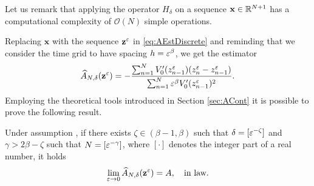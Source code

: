 \documentclass[10pt]{article}
\begin{document}
\begin{remark} Let us remark that applying the operator $H_\delta$ on a sequence $\mathbf x \in \mathbb{R}^{N+1}$ has a computational complexity of $\mathcal O(N)$ simple operations. 
\end{remark}

Replacing $\mathbf x$ with the sequence $\mathbf z^\varepsilon$ in \eqref{eq:AEstDiscrete} and reminding that we consider the time grid to have spacing $h = \varepsilon^\beta$, we get the estimator 
\begin{equation}\label{eq:AEstDiscreteZ}
	\widehat A_{N, \delta}(\mathbf z^\varepsilon) = -\frac{\sum_{n=1}^{N}V_0'(z^\varepsilon_{n-1})(z^\varepsilon_n - z^\varepsilon_{n-1})}{\sum_{n=1}^{N} \varepsilon^\beta V_0'(z^\varepsilon_{n-1})^2}.
\end{equation}
Employing the theoretical tools introduced in Section \ref{sec:ACont} it is possible to prove the following result.
\begin{theorem}\label{thm:DriftDiscrete} Under assumption , if there exists $\zeta \in (\beta - 1, \beta)$ such that $\delta = [\varepsilon^{-\zeta}]$ and $\gamma > 2\beta - \zeta$ such that $N = [\varepsilon^{-\gamma}]$, where $[\cdot]$ denotes the integer part of a real number, it holds 
	\begin{equation}
	\lim_{\varepsilon\to 0} \widehat A_{N, \delta}(\mathbf z^\varepsilon) = A, \quad \text{in law}.
	\end{equation}
\end{theorem}
\end{document}
